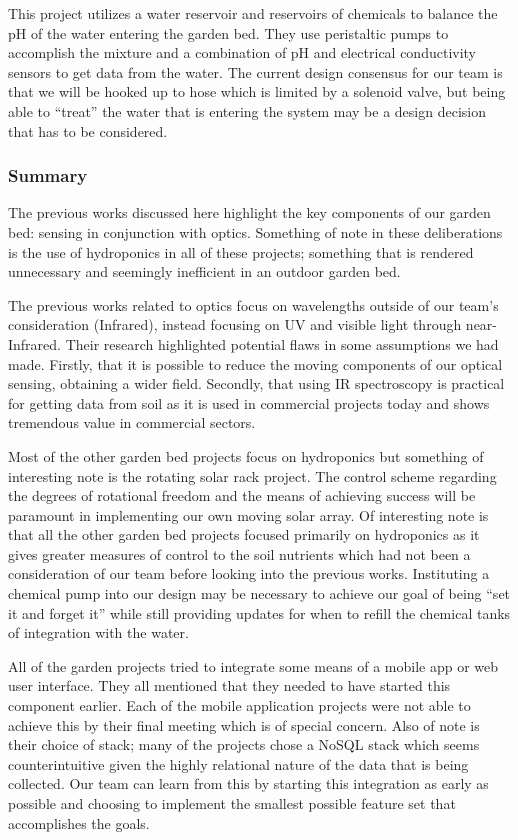 This project utilizes a water reservoir and reservoirs of chemicals to balance the pH of the water entering the garden bed. They use peristaltic pumps to accomplish the mixture and a combination of pH and electrical conductivity sensors to get data from the water. The current design consensus for our team is that we will be hooked up to hose which is limited by a solenoid valve, but being able to ``treat'' the water that is entering the system may be a design decision that has to be considered.
\subsubsection{Summary}
The previous works discussed here highlight the key components of our garden bed: sensing in conjunction with optics. Something of note in these deliberations is the use of hydroponics in all of these projects; something that is rendered unnecessary and seemingly inefficient in an outdoor garden bed.

The previous works related to optics focus on wavelengths outside of our team's consideration (Infrared), instead focusing on UV and visible light through near-Infrared. Their research highlighted potential flaws in some assumptions we had made. Firstly, that it is possible to reduce the moving components of our optical sensing, obtaining a wider field. Secondly, that using IR spectroscopy is practical for getting data from soil as it is used in commercial projects today and shows tremendous value in commercial sectors.

Most of the other garden bed projects focus on hydroponics but something of interesting note is the rotating solar rack project. The control scheme regarding the degrees of rotational freedom and the means of achieving success will be paramount in implementing our own moving solar array. Of interesting note is that all the other garden bed projects focused primarily on hydroponics as it gives greater measures of control to the soil nutrients which had not been a consideration of our team before looking into the previous works. Instituting a chemical pump into our design may be necessary to achieve our goal of being ``set it and forget it'' while still providing updates for when to refill the chemical tanks of integration with the water.

All of the garden projects tried to integrate some means of a mobile app or web user interface. They all mentioned that they needed to have started this component earlier. Each of the mobile application projects were not able to achieve this by their final meeting which is of special concern. Also of note is their choice of stack; many of the projects chose a NoSQL stack which seems counterintuitive given the highly relational nature of the data that is being collected. Our team can learn from this by starting this integration as early as possible and choosing to implement the smallest possible feature set that accomplishes the goals.
